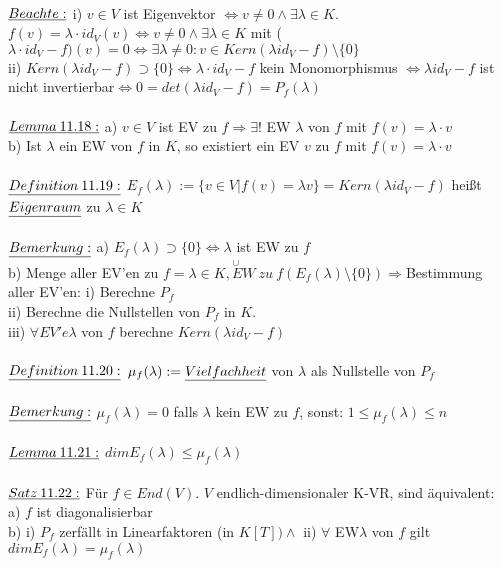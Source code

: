 \documentclass[fleqn, a4paper, 11pt]{scrartcl}
\theoremstyle{definition}
\begin{document}
\\
$\uline{Beachte:}$ i) $v\in V$ ist Eigenvektor $\Leftrightarrow v\neq 0\wedge \exists\lambda\in K$. $f(v)=\lambda\cdot id_V(v)\Leftrightarrow v\neq 0\wedge\exists\lambda\in K$ mit ($\lambda\cdot id_V -f)(v)=0\Leftrightarrow\exists\lambda\neq 0:v\in Kern(\lambda id_V-f)\setminus\{0\}$\\
ii) $Kern(\lambda id_V-f)\supset\{0\}\Leftrightarrow \lambda\cdot id_V -f$ kein Monomorphismus $\Leftrightarrow \lambda id_V -f$ ist nicht invertierbar$\Leftrightarrow 0=det(\lambda id_V-f)=P_f(\lambda)$\\
\\
$\uline{Lemma\:11.18:}$ a) $v\in V$ ist EV zu $f\Rightarrow\exists!$ EW $\lambda$ von $f$ mit $f(v)=\lambda\cdot v$\\
b) Ist $\lambda$ ein EW von $f$ in $K$, so existiert ein EV $v$ zu $f$ mit $f(v)=\lambda\cdot v$\\
\\
$\uline{Definition\:11.19:}$ $E_f(\lambda):=\{v\in V|f(v)=\lambda v\}=Kern(\lambda id_V-f)$ heißt $\uline{Eigenraum}$ zu $\lambda\in K$\\
\\
$\uline{Bemerkung:}$ a) $E_f(\lambda)\supset\{0\}\Leftrightarrow \lambda$ ist EW zu $f$\\
b) Menge aller EV'en zu $f=\stackrel{\cup}{\lambda\in K,EW\:zu\:f}(E_f(\lambda)\setminus\{0\})\Rightarrow$Bestimmung aller EV'en: i) Berechne $P_f$\\
ii) Berechne die Nullstellen von $P_f$ in $K$.\\
iii) $\forall EV'e\lambda$ von $f$ berechne $Kern(\lambda id_V-f)$\\
\\
$\uline{Definition\:11.20:}$ $\mu_f(\lambda):=\uline{Vielfachheit}$ von $\lambda$ als Nullstelle von $P_f$\\
\\
$\uline{Bemerkung:}$ $\mu_f(\lambda)=0$ falls $\lambda$ kein EW zu $f$, sonst: $1\leq \mu_f(\lambda)\leq n$\\
\\
$\uline{Lemma\:11.21:}$ $dim E_f(\lambda)\leq \mu_f(\lambda)$\\
\\
$\uline{Satz\:11.22:}$ Für $f\in End(V)$. $V$ endlich-dimensionaler K-VR, sind äquivalent:\\
a) $f$ ist diagonalisierbar\\
b) i) $P_f$ zerfällt in Linearfaktoren (in $K[T])\wedge$ ii) $\forall$ EW$\lambda$ von $f$ gilt $dim E_f(\lambda)=\mu_f(\lambda)$\\
\end{document}
